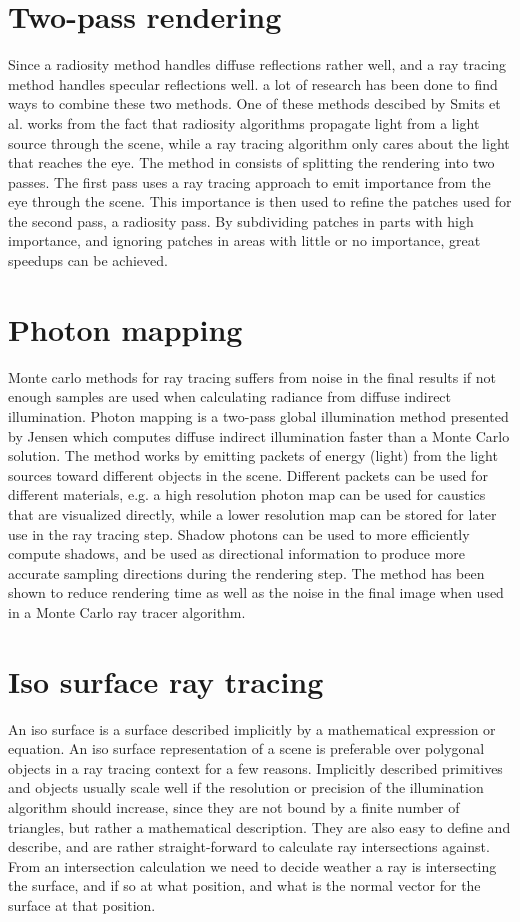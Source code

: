 \documentclass[a4paper, 12pt]{report}
\begin{document}
\section{Two-pass rendering}
Since a radiosity method handles diffuse reflections rather well, and a ray tracing method handles specular reflections well. a lot of research has been done to find ways to combine these two methods.
One of these methods descibed by Smits et al. \cite{importance_radiosity} works from the fact that radiosity algorithms propagate light from a light source through the scene, while a ray tracing algorithm only cares about the light that reaches the eye.
The method in \cite{importance_radiosity} consists of splitting the rendering into two passes.
The first pass uses a ray tracing approach to emit importance from the eye through the scene.
This importance is then used to refine the patches used for the second pass, a radiosity pass.
By subdividing patches in parts with high importance, and ignoring patches in areas with little or no importance, great speedups can be achieved.
 

\section{Photon mapping}
Monte carlo methods for ray tracing suffers from noise in the final results if not enough samples are used when calculating radiance from diffuse indirect illumination.
Photon mapping is a two-pass global illumination method presented by Jensen \cite{photon_maps} which computes diffuse indirect illumination faster than a Monte Carlo solution.
The method works by emitting packets of energy (light) from the light sources toward different objects in the scene.
Different packets can be used for different materials, e.g. a high resolution photon map can be used for caustics that are visualized directly, while a lower resolution map can be stored for later use in the ray tracing step.
Shadow photons can be used to more efficiently compute shadows, and be used as directional information to produce more accurate sampling directions during the rendering step.
The method has been shown to reduce rendering time as well as the noise in the final image when used in a Monte Carlo ray tracer algorithm.
  
\section{Iso surface ray tracing}
An iso surface is a surface described implicitly by a mathematical expression or equation. 
An iso surface representation of a scene is preferable over polygonal objects in a ray tracing context for a few reasons. Implicitly described primitives and objects usually scale well if the resolution or precision of the illumination algorithm should increase, since they are not bound by a finite number of triangles, but rather a mathematical description. 
They are also easy to define and describe, and are rather straight-forward to calculate ray intersections against. 
From an intersection calculation we need to decide weather a ray is intersecting the surface, and if so at what position, and what is the normal vector for the surface at that position. 
\end{document}
